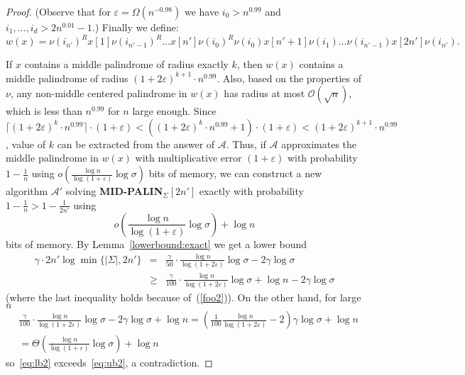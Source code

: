 \documentclass{article}[11pt,letter]
\newcommand{\bigo}{\mathcal{O}}
\newcommand{\alg}{\mathcal{A}}
\newcommand{\midpalin}[1][n]{{\bf MID-PALIN}$_{\Sigma}[#1]$\xspace}
\begin{document}
\begin{proof}
(Observe that for $\varepsilon = \Omega(n^{-0.98})$ we have $i_0 > n^{0.99}$ and $i_1,\ldots,i_d > 2n^{0.01}-1$.) Finally we define:
\[w(x) = \nu(i_{n'})^R x[1] \nu(i_{n'-1})^R  \ldots x[n'] \nu(i_{0})^R \nu(i_{0}) x[n'+1] \nu(i_{1}) \ldots \nu(i_{n'-1}) x[2n'] \nu(i_{n'}).\]

If $x$ contains a middle palindrome of radius exactly $k$, then $w(x)$ contains a middle palindrome of radius  $(1+2\varepsilon)^{k+1} \cdot n^{0.99}$.
Also, based on the properties of $\nu$, any non-middle centered palindrome in $w(x)$ has radius at most $\bigo(\sqrt{n})$, which is less than $n^{0.99}$ for $n$ large 
enough. Since $\lceil(1+2\varepsilon)^{k}\cdot n^{0.99}\rceil \cdot (1+\varepsilon) < ((1+2\varepsilon)^{k}\cdot n^{0.99}+1) \cdot (1+\varepsilon) <(1+2\varepsilon)^{k+1}\cdot n^{0.99}$, value of $k$ can be extracted from the answer of $\alg$.
Thus, if $\alg$ approximates the middle palindrome in $w(x)$ with multiplicative error $(1+\varepsilon)$ with probability $1-\frac{1}{n}$
using
$o(\frac{\log n}{\log(1+\varepsilon)}\log\sigma)$ bits of memory, we can construct a new algorithm $\alg'$ solving \midpalin[2n'] exactly with
probability $1-\frac{1}{n}>1-\frac{1}{2n'}$ using
\begin{equation}
\label{eq:ub2}
o(\frac{\log n}{\log(1+\varepsilon)}\log\sigma) + \log n
\end{equation}
bits of memory.
By Lemma~\ref{lowerbound:exact}  we get a lower bound
\begin{eqnarray}
\gamma \cdot 2n' \log \min \{|\Sigma|,2n'\}  &=& \frac{\gamma}{50} \cdot \frac{\log n}{\log(1+2\varepsilon)} \log\sigma - 2\gamma\log\sigma\nonumber \\
&\ge &\frac{\gamma}{100} \cdot \frac{\log n}{\log(1+2\varepsilon)} \log\sigma + \log n - 2\gamma\log\sigma
\label{eq:lb2}
\end{eqnarray}
(where the last inequality holds because of~(\ref{foo2})). On the other hand, for large $n$
\begin{eqnarray*}
&\frac{\gamma}{100}\cdot \frac{\log n}{\log(1+2\varepsilon)}\log\sigma  - 2\gamma\log\sigma + \log n=\left(\frac{1}{100}\frac{\log n}{\log(1+2\varepsilon)}-2\right)\gamma\log\sigma +\log n\\
&=\Theta\left(\frac{\log n}{\log(1+\varepsilon)}\log\sigma\right) + \log n
\end{eqnarray*}
so~\eqref{eq:lb2} exceeds~\eqref{eq:ub2}, a contradiction.
\end{proof}

\newpage
\end{document}
